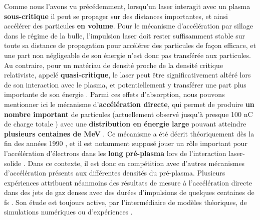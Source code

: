 \begin{refsection}
Comme nous l'avons vu précédemment, lorsqu'un laser interagit avec un plasma \textbf{sous-critique} il peut se propager sur des distances importantes, et ainsi accélérer des particules \textbf{en volume}. Pour le mécanisme d'accélération par sillage dans le régime de la bulle, l'impulsion laser doit rester suffisamment stable sur toute sa distance de propagation pour accélérer des particules de façon efficace, et une part non négligeable de son énergie n'est donc pas transférée aux particules.
Au contraire, pour un matériau de densité proche de la densité critique relativiste, appelé \textbf{quasi-critique}, le laser peut être significativement altéré lors de son interaction avec le plasma, et potentiellement y transférer une part plus importante de son énergie \parencite{gahn_1999a}. 
Parmi ces effets d'absorption, nous pouvons mentionner ici le mécanisme d'\textbf{accélération directe}, qui permet de produire \textbf{un nombre important} de particules (actuellement observé jusqu'à presque 100 nC de charge totale \parencite{ma_2018}) avec une \textbf{distribution en énergie large} pouvant atteindre \textbf{plusieurs centaines de MeV} \parencite{pukhov_1999}. 
Ce mécanisme a été décrit théoriquement dès la fin des années 1990 \parencite{pukhov_1999}, et il est notamment supposé jouer un rôle important pour l'accélération d'électrons dans les \textbf{long pré-plasma} lors de l'interaction laser-solide \parencite{pukhov_1999, krygier_2014}. 
Dans ce contexte, il est donc en compétition avec d'autres mécanismes d'accélération présents aux différentes densités du pré-plasma. Plusieurs expériences attribuent néanmoins des résultats de mesure à l'accélération directe dans des jets de gaz denses avec des durées d'impulsions de quelques centaines de fs \parencite{gahn_1999a, mangles_2005a}. Son étude est toujours active, par l'intermédiaire de modèles théoriques, de simulations numériques ou d'expériences \parencite{arefiev_2016, jirka_2020, krygier_2014, thevenet_2016}.


\end{refsection}
